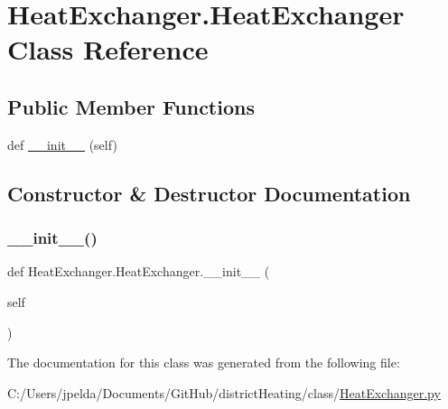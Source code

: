 \hypertarget{class_heat_exchanger_1_1_heat_exchanger}{}\section{Heat\+Exchanger.\+Heat\+Exchanger Class Reference}
\label{class_heat_exchanger_1_1_heat_exchanger}
\subsection*{Public Member Functions}
\begin{DoxyCompactItemize}
\item 
def \hyperlink{class_heat_exchanger_1_1_heat_exchanger_a1c572fc1cc219f709aa83cefccfea350}{\+\_\+\+\_\+init\+\_\+\+\_\+} (self)
\end{DoxyCompactItemize}


\subsection{Constructor \& Destructor Documentation}
\mbox{\label{class_heat_exchanger_1_1_heat_exchanger_a1c572fc1cc219f709aa83cefccfea350}} 
\subsubsection{\texorpdfstring{\+\_\+\+\_\+init\+\_\+\+\_\+()}{\_\_init\_\_()}}
{\footnotesize\ttfamily def Heat\+Exchanger.\+Heat\+Exchanger.\+\_\+\+\_\+init\+\_\+\+\_\+ (\begin{DoxyParamCaption}\item[{}]{self }\end{DoxyParamCaption})}



The documentation for this class was generated from the following file\+:\begin{DoxyCompactItemize}
\item 
C\+:/\+Users/jpelda/\+Documents/\+Git\+Hub/district\+Heating/class/\hyperlink{_heat_exchanger_8py}{Heat\+Exchanger.\+py}\end{DoxyCompactItemize}

